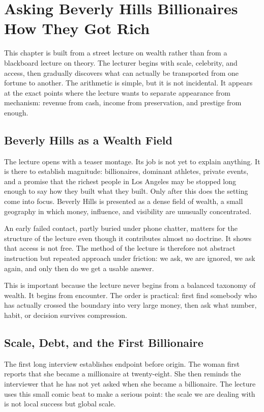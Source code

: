 \chapter{Asking Beverly Hills Billionaires How They Got Rich}

This chapter is built from a street lecture on wealth rather than from a blackboard lecture on theory. The lecturer begins with scale, celebrity, and access, then gradually discovers what can actually be transported from one fortune to another. The arithmetic is simple, but it is not incidental. It appears at the exact points where the lecture wants to separate appearance from mechanism: revenue from cash, income from preservation, and prestige from enough.

\section{Beverly Hills as a Wealth Field}

The lecture opens with a teaser montage. Its job is not yet to explain anything. It is there to establish magnitude: billionaires, dominant athletes, private events, and a promise that the richest people in Los Angeles may be stopped long enough to say how they built what they built. Only after this does the setting come into focus. Beverly Hills is presented as a dense field of wealth, a small geography in which money, influence, and visibility are unusually concentrated.

An early failed contact, partly buried under phone chatter, matters for the structure of the lecture even though it contributes almost no doctrine. It shows that access is not free. The method of the lecture is therefore not abstract instruction but repeated approach under friction: we ask, we are ignored, we ask again, and only then do we get a usable answer.

This is important because the lecture never begins from a balanced taxonomy of wealth. It begins from encounter. The order is practical: first find somebody who has actually crossed the boundary into very large money, then ask what number, habit, or decision survives compression.

\section{Scale, Debt, and the First Billionaire}

The first long interview establishes endpoint before origin. The woman first reports that she became a millionaire at twenty-eight. She then reminds the interviewer that he has not yet asked when she became a billionaire. The lecture uses this small comic beat to make a serious point: the scale we are dealing with is not local success but global scale.

